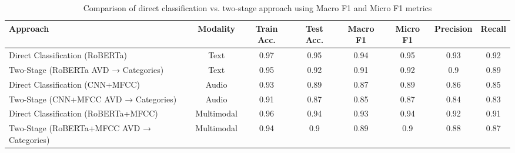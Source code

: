 \begin{table}[h]
\centering
\caption{Comparison of direct classification vs. two-stage approach using Macro F1 and Micro F1 metrics}
\label{tab:categorical_mapping}
\begin{tabular}{|l|c|c|c|c|c|c|c|}
\hline
\textbf{Approach} & \textbf{Modality} & \textbf{Train Acc.} & \textbf{Test Acc.} & \textbf{Macro F1} & \textbf{Micro F1} & \textbf{Precision} & \textbf{Recall} \\
\hline
Direct Classification (RoBERTa) & Text & 0.97 & 0.95 & 0.94 & 0.95 & 0.93 & 0.92 \\
\hline
Two-Stage (RoBERTa AVD → Categories) & Text & 0.95 & 0.92 & 0.91 & 0.92 & 0.9 & 0.89 \\
\hline
Direct Classification (CNN+MFCC) & Audio & 0.93 & 0.89 & 0.87 & 0.89 & 0.86 & 0.85 \\
\hline
Two-Stage (CNN+MFCC AVD → Categories) & Audio & 0.91 & 0.87 & 0.85 & 0.87 & 0.84 & 0.83 \\
\hline
Direct Classification (RoBERTa+MFCC) & Multimodal & 0.96 & 0.94 & 0.93 & 0.94 & 0.92 & 0.91 \\
\hline
Two-Stage (RoBERTa+MFCC AVD → Categories) & Multimodal & 0.94 & 0.9 & 0.89 & 0.9 & 0.88 & 0.87 \\
\hline
\end{tabular}
\end{table}
